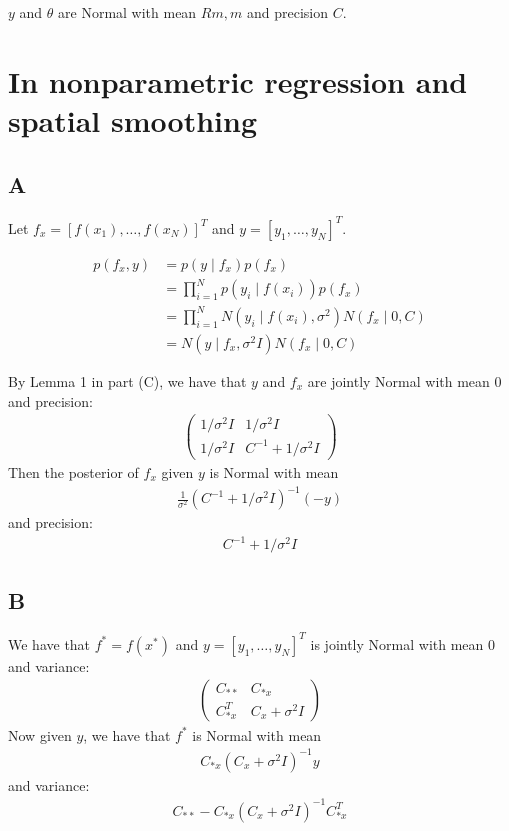 \documentclass{article}
\begin{document}
\(y\) and \(\theta\) are Normal with mean \(Rm, m\) and precision \(C\).

\section*{In nonparametric regression and spatial smoothing}
\subsection*{A}
Let \(f_x = [ f(x_1), \ldots, f(x_N)]^T\) and \( y =  [ y_1, \ldots, y_N ]^T\).

\begin{align*}
p( f_x, y) &= p( y \mid f_x ) p( f_x ) \\
&= \prod_{i=1}^N p(y_i \mid f(x_i) ) p( f_x )\\
&= \prod_{i=1}^N N (y_i \mid f(x_i), \sigma^2) N( f_x \mid 0, C)\\
&= N( y \mid f_x, \sigma^2 I) N(f_x \mid 0, C)
\end{align*}

By Lemma 1 in part (C), we have that  \(y\) and \(f_x\)  are jointly Normal with mean \(0\) and precision:
\begin{align*}
\begin{pmatrix}
1/\sigma^2 I & 1/\sigma^2 I\\
1/\sigma^2 I & C^{-1} + 1/\sigma^2 I
\end{pmatrix}
\end{align*}
Then the posterior of \(f_x\) given \(y\) is Normal with mean 
\begin{align*}
\frac{1}{\sigma^2} (C^{-1} + 1/\sigma^2 I)^{-1}  (- y)
\end{align*}
and precision:
\begin{align*}
C^{-1} + 1/\sigma^2 I
\end{align*}

\subsection*{B}
We have that \(f^* = f(x^*)\) and \(y = [y_1, \ldots, y_N]^T\)  is jointly Normal with mean \(0\) and variance:
\begin{align*}
\begin{pmatrix}
C_{**} & C_{*x}\\
C_{*x}^T & C_x + \sigma^2 I
\end{pmatrix}
\end{align*}
Now given \(y\), we have that \(f^*\) is Normal with mean
\begin{align*}
C_{*x} (C_x + \sigma^2 I)^{-1} y
\end{align*}
and variance:
\begin{align*}
C_{**} - C_{*x} (C_x + \sigma^2 I)^{-1} C_{*x}^T
\end{align*}
\end{document}
